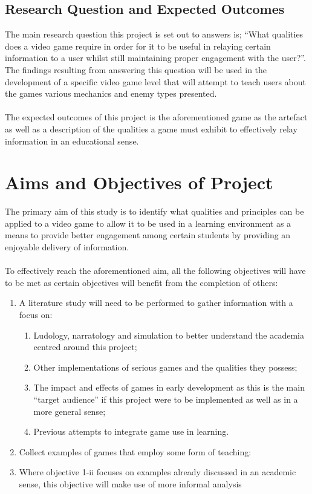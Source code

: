 \subsection{Research Question and Expected Outcomes}
The main research question this project is set out to answers is; “What qualities does a video game require in order for it to be useful in relaying certain information to a user whilst still maintaining proper engagement with the user?”. The findings resulting from answering this question will be used in the development of a specific video game level that will attempt to teach users about the games various mechanics and enemy types presented. 
\\\\
The expected outcomes of this project is the aforementioned game as the artefact as well as a description of the qualities a game must exhibit to effectively relay information in an educational sense.

\section{Aims and Objectives of Project}
The primary aim of this study is to identify what qualities and principles can be applied to a video game to allow it to be used in a learning environment as a means to provide better engagement among certain students by providing an enjoyable delivery of information. 
\\\\
To effectively reach the aforementioned aim, all the following objectives will have to be met as certain objectives will benefit from the completion of others:
\begin{enumerate}
\item A literature study will need to be performed to gather information with a focus on:
\begin{enumerate}
\item Ludology, narratology and simulation to better understand the academia centred around this project;
\item Other implementations of serious games and the qualities they possess;
\item The impact and effects of games in early development as this is the main “target audience” if this project were to be implemented as well as in a more general sense;
\item Previous attempts to integrate game use in learning.
\end{enumerate}
\item Collect examples of games that employ some form of teaching:
\item Where objective 1-ii focuses on examples already discussed in an academic sense, this objective will make use of more informal analysis
\end{enumerate}


